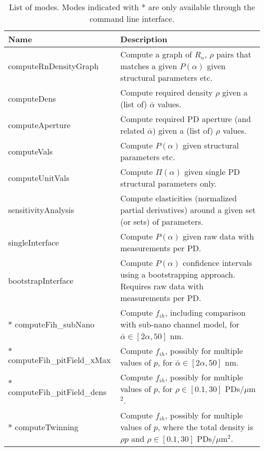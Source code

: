 \documentclass[a4paper,12pt]{article}
\newcommand{\SEL}{\bar{\alpha}}
\newcommand{\patchy}{f_{ih}}
\begin{document}
\begin{table}
\caption{List of modes. Modes indicated with * are only available through the command line interface.}
\label{tab:modes}
\begin{tabular}{l  p{}}
Name & Description\\
\hline
computeRnDensityGraph & Compute a graph of $R_n$, $\rho$ pairs that matches a given $P(\alpha)$ given structural parameters etc.\\
computeDens & Compute required density $\rho$ given a (list of) $\SEL$ values.\\
computeAperture & Compute required PD aperture (and related $\SEL$) given a (list of) $\rho$ values.\\
computeVals & Compute  $P(\alpha)$ given structural parameters etc.\\
computeUnitVals & Compute $\Pi(\alpha)$ given single PD structural parameters only.\\
sensitivityAnalysis & Compute elasticities (normalized partial derivatives) around a given set (or sets) of parameters.\\
singleInterface & Compute $P(\alpha)$ given raw data with measurements per PD.\\
bootstrapInterface & Compute $P(\alpha)$ confidence intervals using a bootstrapping approach. Requires raw data with measurements per PD.\\
$*$ computeFih\_subNano & Compute $\patchy$, including comparison with sub-nano channel model, for $\SEL\in[2\alpha,50]$ nm.\\
$*$ computeFih\_pitField\_xMax & Compute $\patchy$, possibly for multiple values of $p$, for $\SEL\in[2\alpha,50]$ nm.\\
$*$ computeFih\_pitField\_dens& Compute $\patchy$, possibly for multiple values of $p$, for $\rho\in[0.1,30]$ PDs/$\mu$m$^2$.\\
$*$ computeTwinning&Compute $\patchy$, possibly for multiple values of $p$, where the total density is $\rho p$ and $\rho\in[0.1,30]$ PDs/$\mu$m$^2$.\\
\end{tabular}
\end{table}
\end{document}
